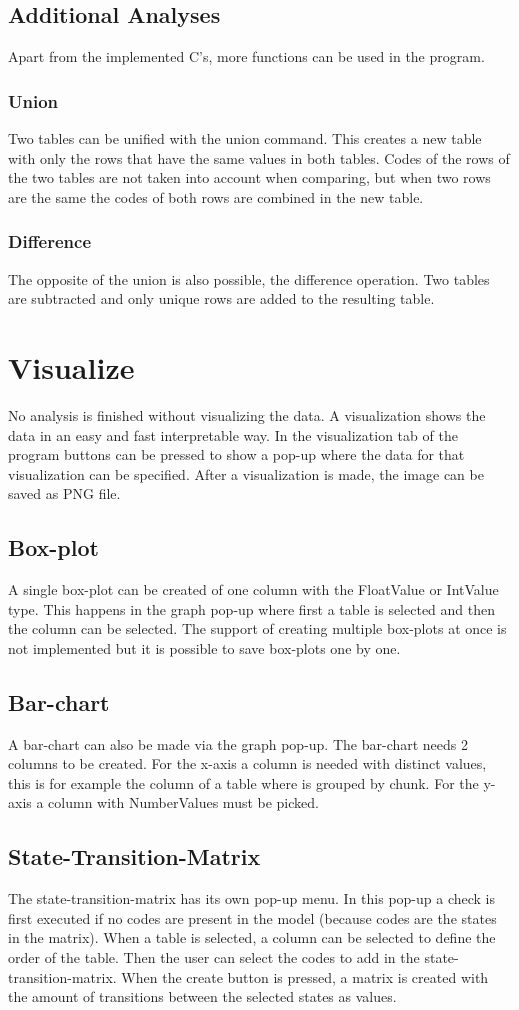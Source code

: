 \subsection{Additional Analyses}
Apart from the implemented C's, more functions can be used in the program.  
\subsubsection{Union}
Two tables can be unified with the union command. This creates a new table with only the rows that have the same values in both tables. Codes of the rows of the two tables are not taken into account when comparing, but when two rows are the same the codes of both rows are combined in the new table.
\subsubsection{Difference}
The opposite of the union is also possible, the difference operation. Two tables are subtracted and only unique rows are added to the resulting table.
\section{Visualize}
No analysis is finished without visualizing the data. A visualization shows the data in an easy and fast interpretable way. In the visualization tab of the program buttons can be pressed to show a pop-up where the data for that visualization can be specified. After a visualization is made, the image can be saved as PNG file.
\subsection{Box-plot}
A single box-plot can be created of one column with the FloatValue or IntValue type. This happens in the graph pop-up where first a table is selected and then the column can be selected. The support of creating multiple box-plots at once is not implemented but it is possible to save box-plots one by one.
\subsection{Bar-chart}
A bar-chart can also be made via the graph pop-up. The bar-chart needs 2 columns to be created. For the x-axis a column is needed with distinct values, this is for example the column of a table where is grouped by chunk. For the y-axis a column with NumberValues must be picked. 
\subsection{State-Transition-Matrix}
The state-transition-matrix has its own pop-up menu. In this pop-up a check is first executed if no codes are present in the model (because codes are the states in the matrix). When a table is selected, a column can be selected to define the order of the table. Then the user can select the codes to add in the state-transition-matrix. When the create button is pressed, a matrix is created with the amount of transitions between the selected states as values.

